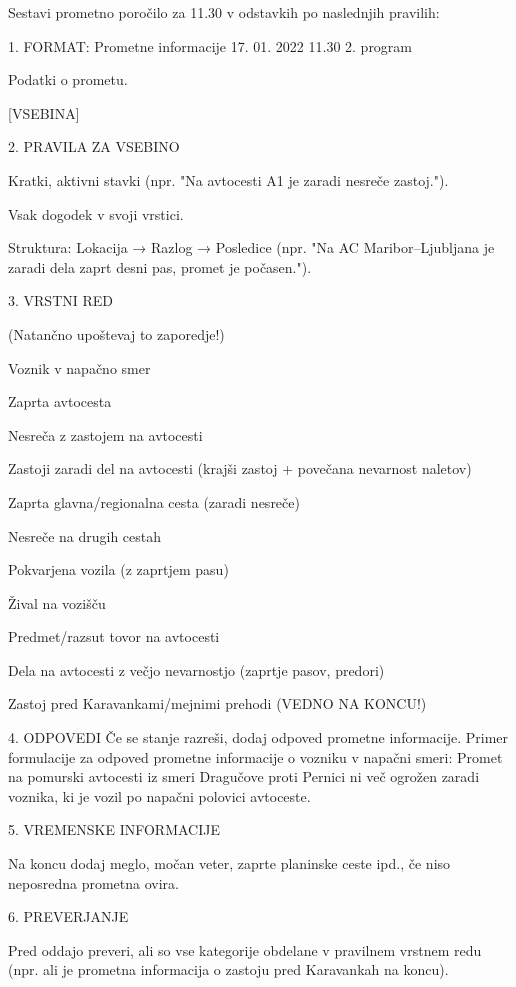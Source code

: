 \documentclass[fleqn,moreauthors,10pt]{ds_report}
\begin{document}
\begin{scriptsize}
    

Sestavi prometno poročilo za 11.30 v odstavkih po naslednjih pravilih:

1. FORMAT:
Prometne informacije       17. 01. 2022       11.30              2. program

Podatki o prometu.

[VSEBINA]

2. PRAVILA ZA VSEBINO

    Kratki, aktivni stavki (npr. "Na avtocesti A1 je zaradi nesreče zastoj.").

    Vsak dogodek v svoji vrstici.

    Struktura: Lokacija → Razlog → Posledice (npr. "Na AC Maribor–Ljubljana je zaradi dela zaprt desni pas, promet je počasen.").

3. VRSTNI RED

(Natančno upoštevaj to zaporedje!)

    Voznik v napačno smer

    Zaprta avtocesta

    Nesreča z zastojem na avtocesti

    Zastoji zaradi del na avtocesti (krajši zastoj + povečana nevarnost naletov)

    Zaprta glavna/regionalna cesta (zaradi nesreče)

    Nesreče na drugih cestah

    Pokvarjena vozila (z zaprtjem pasu)

    Žival na vozišču

    Predmet/razsut tovor na avtocesti

    Dela na avtocesti z večjo nevarnostjo (zaprtje pasov, predori)

    Zastoj pred Karavankami/mejnimi prehodi (VEDNO NA KONCU!)

4. ODPOVEDI
    Če se stanje razreši, dodaj odpoved prometne informacije.
    Primer formulacije za odpoved prometne informacije o vozniku v napačni smeri:
    Promet na pomurski avtocesti iz smeri Dragučove proti Pernici ni več ogrožen zaradi voznika, ki je vozil po napačni polovici avtoceste. 

5. VREMENSKE INFORMACIJE

    Na koncu dodaj meglo, močan veter, zaprte planinske ceste ipd., če niso neposredna prometna ovira.

6. PREVERJANJE

    Pred oddajo preveri, ali so vse kategorije obdelane v pravilnem vrstnem redu (npr. ali je prometna informacija o zastoju pred Karavankah na koncu).


\end{scriptsize}
\end{document}
